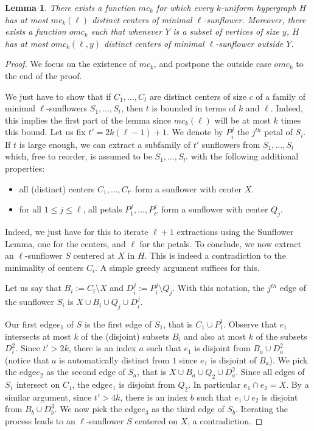 \documentclass{article}
\newcommand{\hedge}{edge\xspace}
\newcommand{\hedges}{edges\xspace}
\newtheorem{lemma}[theorem]{Lemma}
\begin{document}
\begin{lemma}\label{lem:minsun}
There exists a function $mc_k$ for which every $k$-uniform hypergraph $H$ has at most $mc_k(\ell)$ distinct centers of minimal $\ell$-sunflower. Moreover, there exists a function $omc_k$ such that whenever $Y$ is a subset of vertices of size $y$, $H$ has at most $omc_k(\ell,y)$ distinct centers of minimal $\ell$-sunflower outside $Y$.
\end{lemma}

\begin{proof}
We focus on the existence of $mc_k$, and postpone the outside case $omc_k$ to the end of the proof. 

We just have to show that if $C_1,\dots ,C_t$ are distinct centers of size $c$ of a family of minimal $\ell$-sunflowers $S_1,\dots ,S_t$, then $t$ is bounded in terms of $k$ and $\ell$. Indeed, this implies the first part of the lemma since \(mc_k(\ell)\) will be at most \(k\) times this bound. Let us fix $t'=2k(\ell-1)+1$.
We denote by $P_i^j$ the $j^{th}$ petal of $S_i$. If  $t$ is large enough, we can extract a subfamily of $t'$ sunflowers from $S_1,\dots ,S_t$ which, free to reorder, is assumed to be $S_1,\dots ,S_{t'}$ with the following additional properties:

\begin{itemize}
    \item all (distinct) centers $C_1,\dots ,C_{t'}$ form a sunflower with center $X$. 
    \item for all $1\leq j\leq \ell$, all petals $P_1^j,\dots ,P_{t'}^j$ form a sunflower with center $Q_j$. 
\end{itemize}


Indeed, we just have for this to iterate $\ell +1$ extractions using the Sunflower Lemma, one for the centers, and $\ell$ for the petals. To conclude, we now extract an $\ell$-sunflower $S$ centered at $X$ in \(H\). This is indeed a contradiction to the minimality of centers $C_i$. A simple greedy argument suffices for this.

Let us say that $B_i:= C_i\setminus X$ and $D_i^j:=P_i^j\setminus Q_j$. With this notation, the $j^{th}$ \hedge of the sunflower $S_i$ is $X\cup B_i\cup Q_j\cup D_i^j$. 

Our first \hedge $e_1$ of $S$ is the first \hedge of $S_1$, that is $C_1\cup P_1^1$. Observe that $e_1$ intersects at most $k$ of the (disjoint) subsets $B_i$ and also at most $k$ of the subsets $D_i^2$. Since $t'>2k$, there is an index $a$ such that $e_1$ is disjoint from $B_a\cup D_a^2$ (notice that \(a\) is automatically distinct from \(1\) since \(e_1\) is disjoint of \(B_a\)). We pick the \hedge $e_2$ as the second \hedge of $S_a$, that is $X\cup B_a\cup Q_2\cup D_a^2$. Since all \hedges of $S_1$ intersect on $C_1$, the \hedge $e_1$ is disjoint from $Q_2$. In particular $e_1\cap e_2=X$. By a similar argument, since $t'>4k$, there is an index $b$ such that $e_1\cup e_2$ is disjoint from $B_b\cup D_b^3$. We now pick the \hedge $e_3$ as the third \hedge of $S_b$. Iterating the process leads to an $\ell$-sunflower $S$ centered on $X$, a contradiction.


\end{proof}
\end{document}

